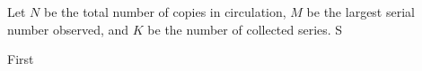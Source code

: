 \documentclass{article}
\begin{document}



Let $N$ be the total number of copies in circulation, $M$ be the largest serial number observed, and $K$ be the number of collected series. S

First 



 
\end{document}
